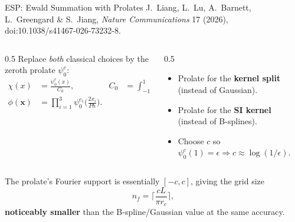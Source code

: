 \documentclass[aspectratio=169,11pt]{beamer}
\newcommand{\dd}{\,\mathrm d}
\newcommand{\x}{\bm{x}}
\newcommand{\hl}[1]{{\color{CCMorange}\textbf{#1}}}
\newcommand{\gray}[1]{{\color{mygray}#1}}
\begin{document}
\begin{frame}{ESP: Ewald Summation with Prolates}
\small
\gray{J.\ Liang, L.\ Lu, A.\ Barnett, L.\ Greengard \& S.\ Jiang, \emph{Nature Communications} 17 (2026), doi:10.1038/s41467-026-73232-8.}
\begin{columns}[T,totalwidth=\textwidth]
\begin{column}{0.5\textwidth}
Replace \emph{both} classical choices by the zeroth prolate \(\psi_0^c\):
\[
  \begin{aligned}
  \chi(x)&=\frac{\psi_0^c(x)}{C_0}, & C_0&=\int_{-1}^{1}\psi_0^c(t)\dd t,\\
  \phi(\x)&=\prod_{i=1}^3 \psi_0^{c_1}\!\Big(\tfrac{2x_i}{Ph}\Big).
  \end{aligned}
\]
\end{column}
\begin{column}{0.5\textwidth}
\begin{itemize}\itemsep2pt
  \item Prolate for the \hl{kernel split} (instead of Gaussian).
  \item Prolate for the \hl{SI kernel} (instead of B-splines).
  \item Choose \(c\) so \(\psi_0^c(1)=\epsilon\Rightarrow c\approx\log(1/\epsilon)\).
\end{itemize}
\end{column}
\end{columns}
\vspace{2mm}
The prolate's Fourier support is essentially \([-c,c]\), giving the grid size
\[
  n_f=\Big\lceil \frac{cL}{\pi r_c}\Big\rceil,
\]
\hl{noticeably smaller} than the B-spline/Gaussian value at the same accuracy.
\end{frame}
\end{document}

